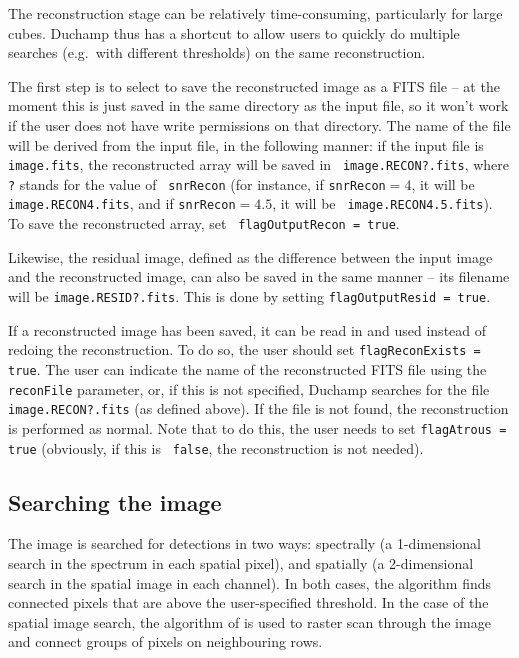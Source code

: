 \documentclass[12pt,a4paper]{article}
\newcommand{\eg}{e.g.\ }
\begin{document}
The reconstruction stage can be relatively time-consuming,
particularly for large cubes. Duchamp thus has a shortcut to allow
users to quickly do multiple searches (\eg with different thresholds)
on the same reconstruction.

The first step is to select to save the reconstructed image as a
FITS file -- at the moment this is just saved in the same directory as
the input file, so it won't work if the user does not have write
permissions on that directory. The name of the file will be derived
from the input file, in the following manner: if the input file is
{\tt image.fits}, the reconstructed array will be saved in {\tt
image.RECON?.fits}, where {\tt ?} stands for the value of {\tt
snrRecon} (for instance, if {\tt snrRecon}$=4$, it will be {\tt
image.RECON4.fits}, and if {\tt snrRecon}$=4.5$, it will be {\tt
image.RECON4.5.fits}). To save the reconstructed array, set {\tt
  flagOutputRecon = true}.

Likewise, the residual image, defined as the difference between the
input image and the reconstructed image, can also be saved in the same
manner -- its filename will be {\tt image.RESID?.fits}. This is done
by setting {\tt flagOutputResid = true}.

If a reconstructed image has been saved, it can be read in and used
instead of redoing the reconstruction. To do so, the user should set
{\tt flagReconExists = true}. The user can indicate the name of the
reconstructed FITS file using the {\tt reconFile} parameter, or, if
this is not specified, Duchamp searches for the file {\tt
  image.RECON?.fits} (as defined above). If the file is not found, the
reconstruction is performed as normal. Note that to do this, the user
needs to set {\tt flagAtrous = true} (obviously, if this is {\tt
  false}, the reconstruction is not needed).

\subsection{Searching the image}
\label{sec-detection}

The image is searched for detections in two ways: spectrally (a
1-dimensional search in the spectrum in each spatial pixel), and
spatially (a 2-dimensional search in the spatial image in each
channel). In both cases, the algorithm finds connected pixels that are
above the user-specified threshold. In the case of the spatial image
search, the algorithm of \citet{lutz80} is used to raster scan through
the image and connect groups of pixels on neighbouring rows.
\end{document}
